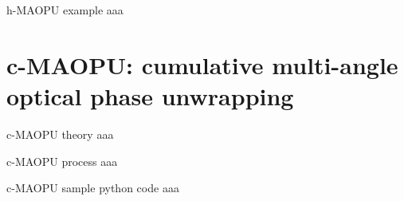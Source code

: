 \documentclass[t, aspectratio=169]{beamer}
\begin{document}


\begin{frame}{h-MAOPU example}
aaa
\end{frame}


\section{c-MAOPU: cumulative multi-angle optical phase unwrapping}
\begin{frame}[c]
	\centering\LARGE\textbf{\secname}
\end{frame}


\begin{frame}{c-MAOPU theory}
aaa
\end{frame}


\begin{frame}{c-MAOPU process}
aaa
\end{frame}


\begin{frame}{c-MAOPU sample python code}
aaa
\end{frame}
\end{document}
